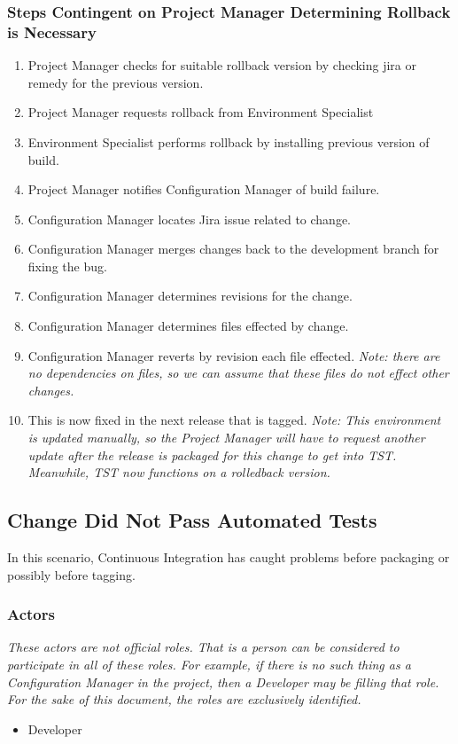 \documentclass[12pt,notitlepage]{article}
\begin{document}
\subsubsection{Steps Contingent on Project Manager Determining Rollback is Necessary}
\begin{enumerate}
  \item Project Manager checks for suitable rollback version by checking jira or remedy for
    the previous version.
  \item Project Manager requests rollback from Environment Specialist
  \item Environment Specialist performs rollback by installing previous version of build.
  \item Project Manager notifies Configuration Manager of build failure.
  \item Configuration Manager locates Jira issue related to change.
  \item Configuration Manager merges changes back to the development branch for fixing the bug.
  \item Configuration Manager determines revisions for the change.
  \item Configuration Manager determines files effected by change.
  \item Configuration Manager reverts by revision each file effected. \emph{Note: there are no dependencies
    on files, so we can assume that these files do not effect other changes. }
  \item This is now fixed in the next release that is tagged. \emph{Note: This environment 
  is updated manually, so the Project Manager will have to request another update after the release
  is packaged for this change to get into TST. Meanwhile, TST now functions on a rolledback version.}  
\end{enumerate}

\subsection{Change Did Not Pass Automated Tests}
In this scenario, Continuous Integration has caught problems before packaging or possibly before tagging.

\subsubsection{Actors}
\emph{These actors are not official roles. That is a person can be considered to
participate in all of these roles. For example, if there is no such thing as a Configuration
Manager in the project, then a Developer may be filling that role. For the sake of
this document, the roles are exclusively identified.}
\begin{itemize}
  \item Developer
\end{itemize}
\end{document}
